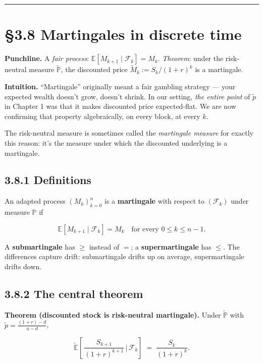 \documentclass[
  10pt,
  twoside]{book}
\begin{document}
\begin{center}\rule{0.5\linewidth}{0.5pt}\end{center}

\section{§3.8 Martingales in discrete
time}\label{martingales-in-discrete-time}

\textbf{Punchline.} A \emph{fair process}:
\(\mathbb E[M_{k+1} \mid \mathcal F_k] = M_k\). \emph{Theorem}: under
the risk-neutral measure \(\tilde{\mathbb P}\), the discounted price
\(\widetilde M_k := S_k / (1+r)^k\) is a martingale.

\textbf{Intuition.} ``Martingale'' originally meant a fair gambling
strategy --- your expected wealth doesn't grow, doesn't shrink. In our
setting, \emph{the entire point} of \(\tilde p\) in Chapter 1 was that
it makes discounted price expected-flat. We are now confirming that
property algebraically, on every block, at every \(k\).

The risk-neutral measure is sometimes called the \emph{martingale
measure} for exactly this reason: it's the measure under which the
discounted underlying is a martingale.

\subsection{3.8.1 Definitions}\label{definitions-11}

An adapted process \((M_k)_{k=0}^n\) is a \textbf{martingale} with
respect to \((\mathcal F_k)\) under measure \(\mathbb P\) if

\[\mathbb E[M_{k+1} \mid \mathcal F_k] = M_k \quad\text{for every } 0 \le k \le n-1.\]

A \textbf{submartingale} has \(\ge\) instead of \(=\); a
\textbf{supermartingale} has \(\le\). The differences capture drift:
submartingale drifts up on average, supermartingale drifts down.

\subsection{3.8.2 The central theorem}\label{the-central-theorem}

\textbf{Theorem (discounted stock is risk-neutral martingale).} Under
\(\tilde{\mathbb P}\) with \(\tilde p = \frac{(1+r) - d}{u - d}\),

\[\tilde{\mathbb E}\!\left[\,\frac{S_{k+1}}{(1+r)^{k+1}}\,\Big|\,\mathcal F_k\right] \;=\; \frac{S_k}{(1+r)^k}.\]
\end{document}
